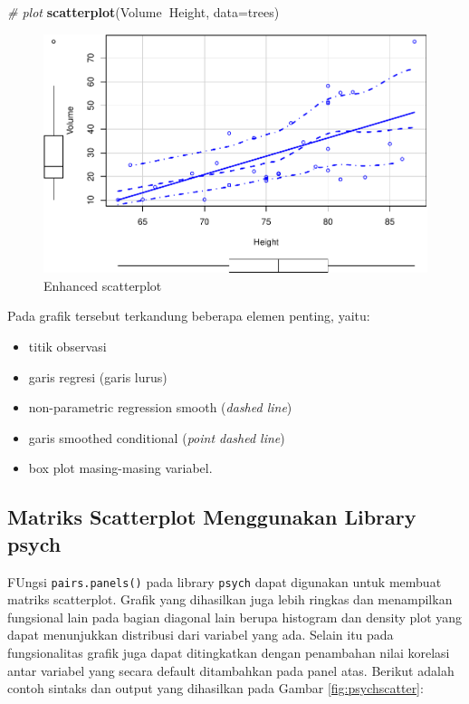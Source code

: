 \documentclass[]{book}
\newenvironment{Shaded}{\begin{snugshade}}{\end{snugshade}}
\newcommand{\KeywordTok}[1]{\textcolor[rgb]{0.13,0.29,0.53}{\textbf{#1}}}
\newcommand{\DataTypeTok}[1]{\textcolor[rgb]{0.13,0.29,0.53}{#1}}
\newcommand{\CommentTok}[1]{\textcolor[rgb]{0.56,0.35,0.01}{\textit{#1}}}
\newcommand{\OperatorTok}[1]{\textcolor[rgb]{0.81,0.36,0.00}{\textbf{#1}}}
\newcommand{\NormalTok}[1]{#1}
\providecommand{\tightlist}{%
  \setlength{\itemsep}{0pt}\setlength{\parskip}{0pt}}
\begin{document}
\begin{Shaded}
\begin{Highlighting}[]
\CommentTok{# plot}
\KeywordTok{scatterplot}\NormalTok{(Volume}\OperatorTok{~}\NormalTok{Height, }\DataTypeTok{data=}\NormalTok{trees)}
\end{Highlighting}
\end{Shaded}

\begin{figure}

{\centering \includegraphics[width=0.7\linewidth]{EnvStat_files/figure-latex/carscatter-1} 

}

\caption{Enhanced scatterplot}\label{fig:carscatter}
\end{figure}

Pada grafik tersebut terkandung beberapa elemen penting, yaitu:

\begin{itemize}
\tightlist
\item
  titik observasi
\item
  garis regresi (garis lurus)
\item
  non-parametric regression smooth (\emph{dashed line})
\item
  garis smoothed conditional (\emph{point dashed line})
\item
  box plot masing-masing variabel.
\end{itemize}

\subsection{Matriks Scatterplot Menggunakan Library
psych}\label{matriks-scatterplot-menggunakan-library-psych}

FUngsi \texttt{pairs.panels()} pada library \texttt{psych} dapat
digunakan untuk membuat matriks scatterplot. Grafik yang dihasilkan juga
lebih ringkas dan menampilkan fungsional lain pada bagian diagonal lain
berupa histogram dan density plot yang dapat menunjukkan distribusi dari
variabel yang ada. Selain itu pada fungsionalitas grafik juga dapat
ditingkatkan dengan penambahan nilai korelasi antar variabel yang secara
default ditambahkan pada panel atas. Berikut adalah contoh sintaks dan
output yang dihasilkan pada Gambar \ref{fig:psychscatter}:
\end{document}
